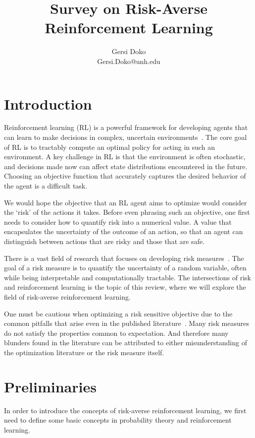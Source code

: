\documentclass[10pt]{article}
\title{Survey on Risk-Averse Reinforcement Learning}
\author{Gersi Doko \\
        Gersi.Doko@unh.edu \\}
\renewcommand{\cite}{\citep}
\theoremstyle{plain}
\theoremstyle{remark}
\begin{document}
\maketitle

\section{Introduction}

Reinforcement learning (RL) is a powerful framework for developing agents that can learn to make decisions in complex, uncertain environments~\cite{sutton2018, Puterman1994, MEHTA2007237, Hall2018}.
The core goal of RL is to tractably compute an optimal policy for acting in such an environment. A key challenge in RL is 
that the environment is often stochastic, and decisions made now can affect state distributions encountered in the
future. Choosing an objective function that accurately captures the desired behavior of the agent is a difficult task.

We would hope the objective that an RL agent aims to optimize would consider the `risk' of the actions it takes. Before even phrasing such an objective, one first needs to consider how to quantify risk into a numerical value. A value that encapsulates the uncertainty of the outcome of an action,
so that an agent can distinguish between actions that are risky and those that are safe.

There is a vast field of research that focuses on developing risk measures~\cite{follmer2016, Hau2023OnDP, Bauerle2011, howard1972}. The goal of a risk measure is to quantify the uncertainty of a random variable, often while being interpretable and computationally tractable. The intersections of risk and reinforcement learning is the topic of this review, where we will explore the field of risk-averse reinforcement learning.

One must be cautious when optimizing a risk sensitive objective due to the
common pitfalls that arise even in the published
literature~\cite{Hau2023OnDP}. Many risk measures do not satisfy the
properties common to expectation. And therefore many blunders found in the literature can be attributed to either
misunderstanding of the optimization literature or the risk measure itself.

\section{Preliminaries}

In order to introduce the concepts of risk-averse reinforcement learning, we first need to define some basic concepts in probability theory and reinforcement learning.
\end{document}
